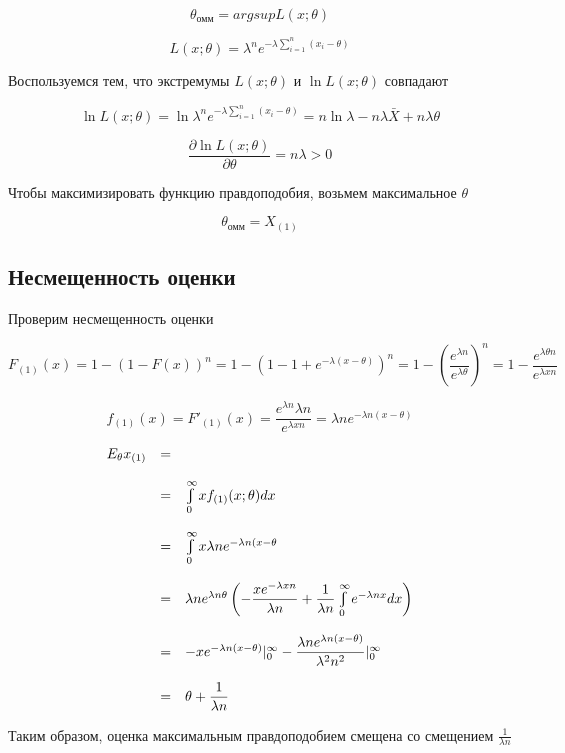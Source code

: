 \documentclass[a4paper,12pt, oneside]{book}
\let\int\varint
\begin{document}
$$
\theta_\text{омм} = argsup L(x; \theta)
$$

$$
L(x;\theta) = \lambda^n e^{-\lambda \sum_{i=1}^n (x_i - \theta)}
$$

Воспользуемся тем, что экстремумы $ L(x; \theta) $ и $ \ln L(x; \theta) $ совпадают

$$
\ln L (x; \theta) = \ln \lambda^n e^{-\lambda \sum_{i=1}^n (x_i - \theta)} = n \ln \lambda - n \lambda \bar{X} + n \lambda \theta 
$$

$$
\dfrac{\partial \ln L(x; \theta)}{\partial \theta} = n \lambda > 0
$$

Чтобы максимизировать функцию правдоподобия, возьмем максимальное $ \theta $

$$
\theta_\text{омм} = X_{(1)}
$$

\subsection{Несмещенность оценки}

Проверим несмещенность оценки

$$
F_{(1)} (x) = 1 - (1 - F(x))^n = 1-(1-1+e^{- \lambda (x - \theta)})^n = 1 - \left(  \dfrac{e^{\lambda n}}{e^{\lambda \theta}} \right)^n = 1 - \dfrac{e^{\lambda \theta n}}{e^{\lambda x n}}
$$

$$
f_{(1)} (x) = F'_(1)(x) = \dfrac{e^{\lambda n} \lambda n}{e^{\lambda x n}} = \lambda n e^{-\lambda n (x- \theta)}
$$


$$
\begin{array}{lcl}
	E_\theta x_{(1)} &=\\
	\\
	&=& \int\limits_{0}^{\infty} x f_{(1)} (x; \theta) dx \\
	\\
	&=&\int\limits_{0}^{\infty} x \lambda n e^{-\lambda n (x- \theta} \\
	\\
	&=&\lambda n e^{\lambda n \theta} \left( - \dfrac{x e^{- \lambda x n}}{\lambda n} + \dfrac{1}{\lambda n} \int\limits_{0}^{\infty} e^{-\lambda n x}dx \right)  \\
	\\
	&=&-x e^{-\lambda n (x- \theta)}|_0^\infty - \dfrac{\lambda n e^{\lambda n (x - \theta)}}{\lambda^2 n^2}|_0^\infty\\
	\\
	&=&\theta + \dfrac{1}{\lambda n}
\end{array}
$$

Таким образом, оценка максимальным правдоподобием смещена со смещением $ \frac{1}{\lambda n} $
\end{document}
